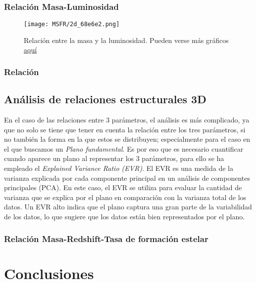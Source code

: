 \documentclass[11pt, a4paper]{article} %
\begin{document}
\subsubsection{Relación Masa-Luminosidad}

\begin{figure}[H]
    \centering
    \texttt{[image: MSFR/2d\_68e6e2.png]}
    \caption{Relación entre la masa y la luminosidad. Pueden verse más gráficos \href{URL}{aquí}}
    \label{fig:pair_ex}
\end{figure}
\subsubsection{Relación }
\subsection{Análisis de relaciones estructurales 3D}

En el caso de las relaciones entre 3 parámetros, el análisis es más complicado, ya que no solo se tiene que tener en cuenta la relación entre los tres parámetros, si no también la forma en la que estos se distribuyen; especialmente para el caso en el que buscamos un \textit{Plano fundamental}. 
Es por eso que es necesario cuantificar cuando aparece un plano al representar los 3 parámetros, para ello se ha empleado el \textit{Explained Variance Ratio (EVR)}. El EVR es una medida de la varianza explicada por cada componente principal en un análisis de componentes principales (PCA). 
En este caso, el EVR se utiliza para evaluar la cantidad de varianza que se explica por el plano en comparación con la varianza total de los datos. Un EVR alto indica que el plano captura una gran parte de la variabilidad de los datos, lo que sugiere que los datos están bien representados por el plano.


\subsubsection{Relación Masa-Redshift-Tasa de formación estelar}
\section{Conclusiones}


\printbibliography
\appendix

\end{document}
